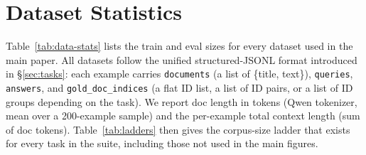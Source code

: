 \section{Dataset Statistics}
\label{app:data-stats}

Table~\ref{tab:data-stats} lists the train and eval sizes for every dataset used in the main paper. All datasets follow the unified structured-JSONL format introduced in \S\ref{sec:tasks}: each example carries \texttt{documents} (a list of \{title, text\}), \texttt{queries}, \texttt{answers}, and \texttt{gold\_doc\_indices} (a flat ID list, a list of ID pairs, or a list of ID groups depending on the task). We report doc length in tokens (Qwen tokenizer, mean over a 200-example sample) and the per-example total context length (sum of doc tokens). Table~\ref{tab:ladders} then gives the corpus-size ladder that exists for every task in the suite, including those not used in the main figures.

